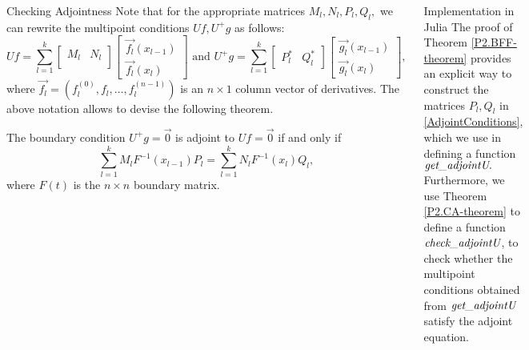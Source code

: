 \documentclass[serif, final, noamsthm]{beamer} %
\begin{document}
\begin{center}
\begin{frame}
\begin{columns}[t]
{	%
\begin{block}{Checking Adjointness}
\justifying
Note that for the appropriate matrices $M_l, N_l, P_l, Q_l,$ we can rewrite the multipoint conditions $Uf, U^+g$ as follows:
\begin{equation}\label{AdjointConditions}
Uf =
\sum^k_{l=1}
\begin{bmatrix}
M_l & N_l \\
\end{bmatrix} 
\begin{bmatrix}
\vec{f_l}(x_{l-1})  \\
\vec{f_l}(x_{l})
\end{bmatrix} \mbox{ and } 
U^+ g =
\sum^k_{l=1}
\begin{bmatrix}
P_l^* & Q_l^*
\end{bmatrix}
\begin{bmatrix}
\vec{g_l}(x_{l-1})  \\
\vec{g_l}(x_{l})
\end{bmatrix},
\end{equation}
where $\vec{f_l} = (f_l^{(0)}, f_l, \ldots, f_l^{(n-1)})$ is an $n \times 1$ column vector of derivatives.
The above notation allows to devise the following theorem.
\begin{thm}\label{P2.CA-theorem}
The boundary condition $U^+g = \vec{0}$ is adjoint to $Uf = \vec{0}$ if and only if \[ \sum^k_{l=1} M_lF^{-1}(x_{l-1})P_l = \sum^k_{l=1} N_l F^{-1}(x_l)Q_l, \] where $F(t)$ is the $n\times n$ boundary matrix.  
\end{thm}
\end{block}

\begin{block}{Implementation in Julia}
\justifying
The proof of Theorem \ref{P2.BFF-theorem} provides an explicit way to construct the matrices $P_l, Q_l$ in \eqref{AdjointConditions}, which we use in defining a function $\textit{get\textunderscore adjointU}.$ Furthermore, we use Theorem \ref{P2.CA-theorem} to define a function $\textit{check\textunderscore adjointU}$, to check whether the multipoint conditions obtained from $\textit{get\textunderscore adjointU}$ satisfy the adjoint equation. 
\end{block}

}
\end{columns}
\end{frame}
\end{center}
\end{document}
